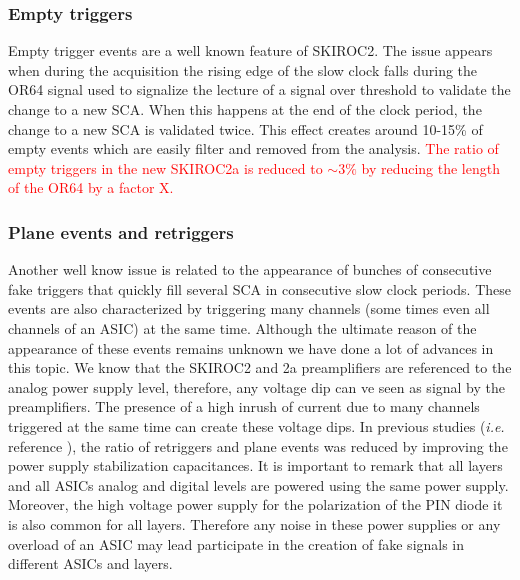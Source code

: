 \documentclass[a4paper,11pt]{article}
\newcommand{\todo}[1]{\textcolor{red}{{#1}}}
\begin{document}
\subsubsection*{Empty triggers}

Empty trigger events are a well known feature of SKIROC2. The issue appears when during
the acquisition the rising edge of the slow clock falls during the OR64 signal used
to signalize the lecture of a signal over threshold to validate the change to a new SCA.
When this happens at the end of the clock period, the change to a new SCA is validated twice.
This effect creates around 10-15\% of empty events which are easily filter and removed from the
analysis. \todo{The ratio of empty triggers in the new SKIROC2a is reduced to $\sim3\%$ by reducing
the length of the OR64 by a factor X.}

\subsubsection*{Plane events and retriggers}

Another well know issue is related to the appearance of bunches of consecutive fake triggers that
quickly fill several SCA in consecutive slow clock periods. These events are also
characterized by triggering many channels (some times even all channels of an ASIC) at the same time.
Although the ultimate reason of the appearance of these events remains unknown we have done
a lot of advances in this topic. We know that the SKIROC2 and 2a preamplifiers are referenced to the analog power supply level,
therefore, any voltage dip can ve seen as signal by the preamplifiers. The presence of a high inrush of current
due to many channels triggered at the same time can create these voltage dips.
In previous studies ({\it i.e.} reference \cite{Amjad:2014tha}), the ratio of retriggers and plane events
was reduced by improving the power supply stabilization capacitances. It is important to remark that
all layers and all ASICs analog and digital levels are powered using the same power supply.
Moreover, the high voltage power supply for the polarization of the PIN diode it is also common for all layers.
Therefore any noise in
these power supplies or any overload of an ASIC may lead participate in the creation of fake signals
in different ASICs and layers.
\end{document}
